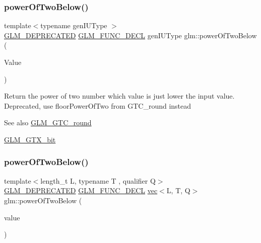 \subsubsection{\texorpdfstring{power\+Of\+Two\+Below()}{powerOfTwoBelow()}\hspace{0.1cm}{\footnotesize\ttfamily [1/2]}}
{\footnotesize\ttfamily template$<$typename gen\+I\+U\+Type $>$ \\
\mbox{\hyperlink{setup_8hpp_a8edfb48cdc249a3ee48406bf179023dc}{G\+L\+M\+\_\+\+D\+E\+P\+R\+E\+C\+A\+T\+ED}} \mbox{\hyperlink{setup_8hpp_ab2d052de21a70539923e9bcbf6e83a51}{G\+L\+M\+\_\+\+F\+U\+N\+C\+\_\+\+D\+E\+CL}} gen\+I\+U\+Type glm\+::power\+Of\+Two\+Below (\begin{DoxyParamCaption}\item[{gen\+I\+U\+Type}]{Value }\end{DoxyParamCaption})}

Return the power of two number which value is just lower the input value. Deprecated, use floor\+Power\+Of\+Two from G\+T\+C\+\_\+round instead

\begin{DoxySeeAlso}{See also}
\mbox{\hyperlink{group__gtc__round}{G\+L\+M\+\_\+\+G\+T\+C\+\_\+round}} 

\mbox{\hyperlink{group__gtx__bit}{G\+L\+M\+\_\+\+G\+T\+X\+\_\+bit}} 
\end{DoxySeeAlso}
\mbox{\label{group__gtx__bit_gaf78ddcc4152c051b2a21e68fecb10980}} 
\subsubsection{\texorpdfstring{power\+Of\+Two\+Below()}{powerOfTwoBelow()}\hspace{0.1cm}{\footnotesize\ttfamily [2/2]}}
{\footnotesize\ttfamily template$<$length\+\_\+t L, typename T , qualifier Q$>$ \\
\mbox{\hyperlink{setup_8hpp_a8edfb48cdc249a3ee48406bf179023dc}{G\+L\+M\+\_\+\+D\+E\+P\+R\+E\+C\+A\+T\+ED}} \mbox{\hyperlink{setup_8hpp_ab2d052de21a70539923e9bcbf6e83a51}{G\+L\+M\+\_\+\+F\+U\+N\+C\+\_\+\+D\+E\+CL}} \mbox{\hyperlink{structglm_1_1vec}{vec}}$<$L, T, Q$>$ glm\+::power\+Of\+Two\+Below (\begin{DoxyParamCaption}\item[{\mbox{\hyperlink{structglm_1_1vec}{vec}}$<$ L, T, Q $>$ const \&}]{value }\end{DoxyParamCaption})}

